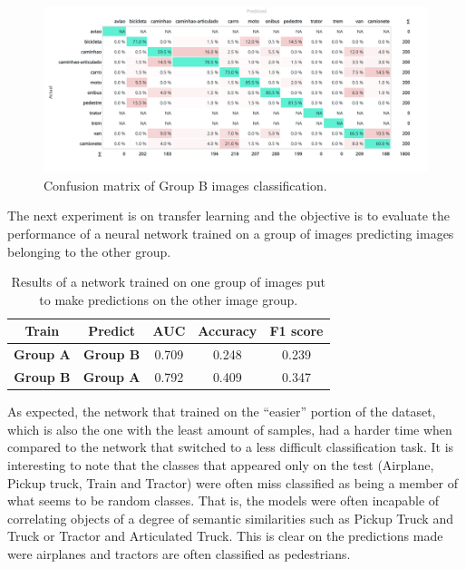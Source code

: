 \documentclass{article}
\begin{document}
\begin{figure}[htbp]
    \centering
    \includegraphics[scale=0.52]{cm_grpb.png}
    \caption{Confusion matrix of Group B images classification.}
    \label{fig:conf_matrix_b}
\end{figure}

The next experiment is on transfer learning and the objective is to evaluate the performance of a neural network trained on a group of images predicting images belonging to the other group.

\begin{table}[htbp]
    \centering
    \begin{tabular}{c|c|c|c|c}
         \textbf{Train} & \textbf{Predict} & \textbf{AUC} & \textbf{Accuracy} & \textbf{F1 score}  \\ \hline
         \textbf{Group A} & \textbf{Group B} & 0.709 & 0.248 & 0.239 \\
         \textbf{Group B} & \textbf{Group A} & 0.792 & 0.409 & 0.347 \\
    \end{tabular}
    \caption{Results of a network trained on one group of images put to make predictions on the other image group.}
    \label{tab:transfer_learning}
\end{table}

As expected, the network that trained on the ``easier'' portion of the dataset, which is also the one with the least amount of samples, had a harder time when compared to the network that switched to a less difficult classification task.
\pagebreak
It is interesting to note that the classes that appeared only on the test (Airplane, Pickup truck, Train and Tractor) were often miss classified as being a member of what seems to be random classes. That is, the models were often incapable of correlating objects of a degree of semantic similarities such as Pickup Truck and Truck or Tractor and Articulated Truck. This is clear on the predictions made were airplanes and tractors are often classified as pedestrians.
\end{document}
